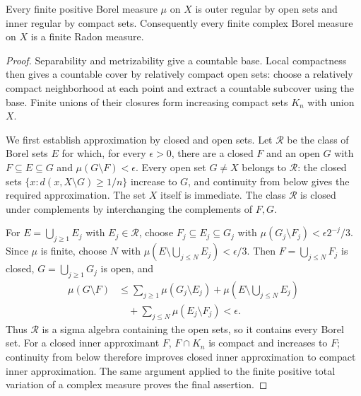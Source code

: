 \begin{lemma}
\label{lem:kernel_finite_measure_regularity}
Every finite positive Borel measure $\mu$ on $X$ is outer regular
by open sets and inner regular by compact sets. Consequently every
finite complex Borel measure on $X$ is a finite Radon measure.
\end{lemma}
\begin{proof}
Separability and metrizability give a countable base. Local compactness
then gives a countable cover by relatively compact open sets: choose
a relatively compact neighborhood at each point and extract a
countable subcover using the base. Finite unions of their closures
form increasing compact sets $K_n$ with union $X$.

We first establish approximation by closed and open sets. Let
$\mathcal R$ be the class of Borel sets $E$ for which, for every
$\epsilon>0$, there are a closed $F$ and an open $G$ with
$F\subseteq E\subseteq G$ and $\mu(G\setminus F)<\epsilon$.
Every open set $G\ne X$ belongs to $\mathcal R$: the closed sets
$\{x:d(x,X\setminus G)\geq1/n\}$ increase to $G$, and continuity
from below gives the required approximation. The set $X$ itself is
immediate. The class $\mathcal R$ is closed under complements by
interchanging the complements of $F,G$.

For $E=\bigcup_{j\geq1}E_j$ with $E_j\in\mathcal R$, choose
$F_j\subseteq E_j\subseteq G_j$ with
$\mu(G_j\setminus F_j)<\epsilon 2^{-j}/3$. Since $\mu$ is finite,
choose $N$ with
$\mu(E\setminus\bigcup_{j\leq N}E_j)<\epsilon/3$.
Then $F=\bigcup_{j\leq N}F_j$ is closed,
$G=\bigcup_{j\geq1}G_j$ is open, and
\[
\begin{aligned}
\mu(G\setminus F)
&\leq\sum_{j\geq1}\mu(G_j\setminus E_j)
 +\mu\left(E\setminus\bigcup_{j\leq N}E_j\right)\\
&\quad +\sum_{j\leq N}\mu(E_j\setminus F_j)<\epsilon.
\end{aligned}
\]
Thus $\mathcal R$ is a sigma algebra containing the open sets, so it
contains every Borel set. For a closed inner approximant $F$,
$F\cap K_n$ is compact and increases to $F$; continuity from below
therefore improves closed inner approximation to compact inner
approximation. The same argument applied to the finite positive
total variation of a complex measure proves the final assertion.
\end{proof}

